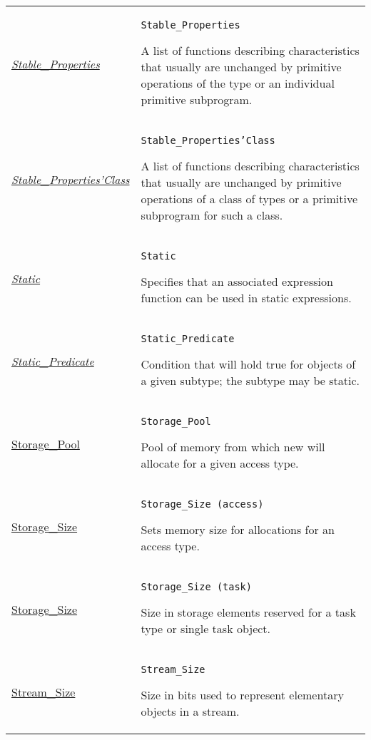 \documentclass[english]{article}
\begin{document}
\begin{scriptsize}
\begin{multicols*}{3}
\begin{tabular}{@{}p{2cm}p{6.5cm}}
   \href{http://www.ada-auth.org/standards/22rm/html/RM-7-3-4.html}{\textit{Stable\_Properties}} & \texttt{Stable\_Properties}

   A list of functions describing characteristics that usually are unchanged by primitive operations of the type or an individual primitive subprogram.\\

   \href{http://www.ada-auth.org/standards/22rm/html/RM-7-3-4.html}{\textit{Stable\_Properties'Class}} & \texttt{Stable\_Properties'Class}

   A list of functions describing characteristics that usually are unchanged by primitive operations of a class of types or a primitive subprogram for such a class.\\

   \href{http://www.ada-auth.org/standards/22rm/html/RM-6-8.html}{\textit{Static}} & \texttt{Static}

   Specifies that an associated expression function can be used in static expressions.\\

   \href{http://www.ada-auth.org/standards/22rm/html/RM-3-2-4.html}{\textit{Static\_Predicate}} & \texttt{Static\_Predicate}

   Condition that will hold true for objects of a given subtype; the subtype may be static.\\

   \href{http://www.ada-auth.org/standards/22rm/html/RM-13-11.html}{Storage\_Pool} & \texttt{Storage\_Pool}

   Pool of memory from which new will allocate for a given access type.\\

   \href{http://www.ada-auth.org/standards/22rm/html/RM-13-11.html}{Storage\_Size} & \texttt{Storage\_Size (access)}

   Sets memory size for allocations for an access type.\\

   \href{http://www.ada-auth.org/standards/22rm/html/RM-13-3.html}{Storage\_Size} & \texttt{Storage\_Size (task)}

   Size in storage elements reserved for a task type or single task object.\\

   \href{http://www.ada-auth.org/standards/22rm/html/RM-13-13-2.html}{Stream\_Size} & \texttt{Stream\_Size}

   Size in bits used to represent elementary objects in a stream.\\


\end{tabular}
\end{multicols*}
\end{scriptsize}
\end{document}
